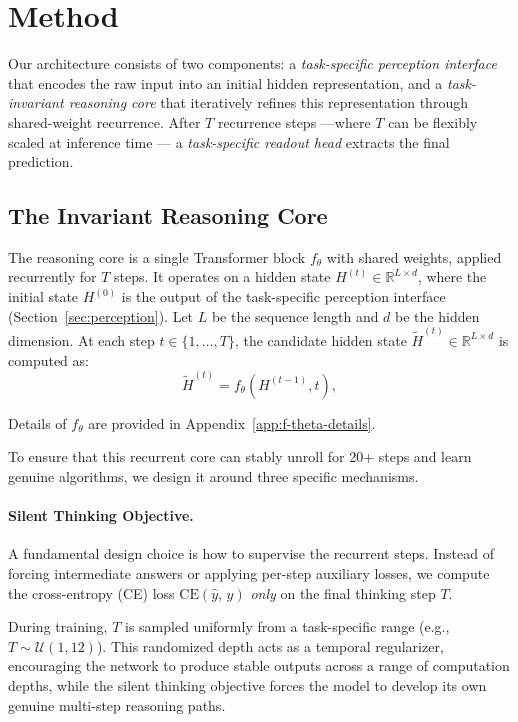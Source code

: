 \section{Method}
\label{sec:method}
 
Our architecture consists of two components: a \emph{task-specific perception interface} that encodes the raw input into an initial hidden representation, and a \emph{task-invariant reasoning core} that iteratively refines this representation through shared-weight recurrence. After $T$ recurrence steps ---where $T$ can be flexibly scaled at inference time --- a \emph{task-specific readout head} extracts the final prediction.
 
\subsection{The Invariant Reasoning Core}
\label{sec:core}

The reasoning core is a single Transformer block $f_\theta$ with shared weights, applied recurrently for $T$ steps. It operates on a hidden state $H^{(t)} \in \mathbb{R}^{L \times d}$, where the initial state $H^{(0)}$ is the output of the task-specific perception interface (Section~\ref{sec:perception}). Let $L$ be the sequence length and $d$ be the hidden dimension. At each step $t \in \{1, \dots, T\}$, the candidate hidden state $\tilde{H}^{(t)} \in \mathbb{R}^{L \times d}$ is computed as:
\begin{equation}
    \tilde{H}^{(t)} = f_\theta(H^{(t-1)}, t),
\end{equation}

Details of $f_\theta$ are provided in Appendix~\ref{app:f-theta-details}.

To ensure that this recurrent core can stably unroll for 20+ steps and learn genuine algorithms, we design it around three specific mechanisms.

\paragraph{Silent Thinking Objective.}
A fundamental design choice is how to supervise the recurrent steps. Instead of forcing intermediate answers or applying per-step auxiliary losses, we compute the cross-entropy (CE) loss $\text{CE}(\hat{y},\, y)$ \emph{only} on the final thinking step $T$.

During training, $T$ is sampled uniformly from a task-specific range (e.g., $T \sim \mathcal{U}(1, 12)$). This randomized depth acts as a temporal regularizer, encouraging the network to produce stable outputs across a range of computation depths, while the silent thinking objective forces the model to develop its own genuine multi-step reasoning paths.
 
